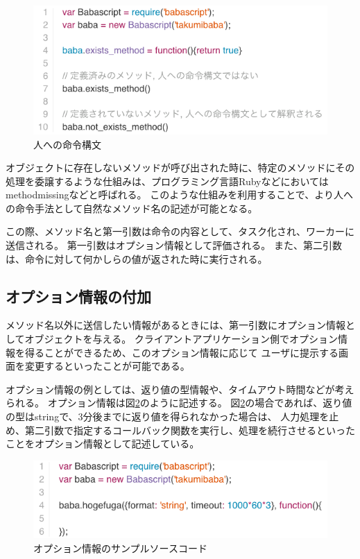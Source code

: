 \begin{figure}[htbp]
  \begin{center}
  \includegraphics[width=.8\linewidth,bb=0 0 577 253]{images/methodmissing_sample.js.png}
  \end{center}
  \caption{人への命令構文}
  \label{fig:methodmissing_sample}
\end{figure}

オブジェクトに存在しないメソッドが呼び出された時に、特定のメソッドにその処理を委譲するような仕組みは、プログラミング言語Rubyなどにおいては
methodmissingなどと呼ばれる。
このような仕組みを利用することで、より人への命令手法として自然なメソッド名の記述が可能となる。

この際、メソッド名と第一引数は命令の内容として、タスク化され、ワーカーに送信される。
第一引数はオプション情報として評価される。
また、第二引数は、命令に対して何かしらの値が返された時に実行される。

\subsection{オプション情報の付加}\label{ux30aaux30d7ux30b7ux30e7ux30f3ux60c5ux5831ux306eux4ed8ux52a0}

メソッド名以外に送信したい情報があるときには、第一引数にオプション情報としてオブジェクトを与える。
クライアントアプリケーション側でオプション情報を得ることができるため、このオプション情報に応じて
ユーザに提示する画面を変更するといったことが可能である。

オプション情報の例としては、返り値の型情報や、タイムアウト時間などが考えられる。
オプション情報は図\ref{fig:babascript_option}のように記述する。
図\ref{fig:babascript_option}の場合であれば、返り値の型はstringで、3分後までに返り値を得られなかった場合は、
人力処理を止め、第二引数で指定するコールバック関数を実行し、処理を続行させるといったことをオプション情報として記述している。

\begin{figure}[htbp]
  \begin{center}
  \includegraphics[width=.8\linewidth,bb=0 0 563 149]{images/babascript_option_sample.js.png}
  \end{center}
  \caption{オプション情報のサンプルソースコード}
  \label{fig:babascript_option}
\end{figure}


